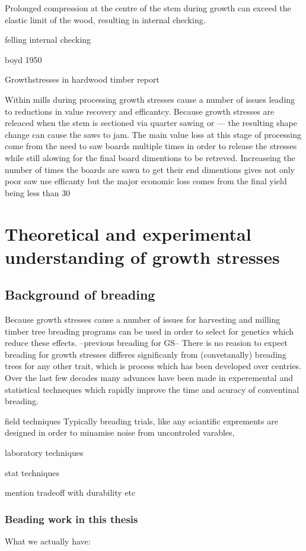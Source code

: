 \documentclass{article}
\begin{document}
Prolonged compression at the centre of the stem during growth can exceed the
elastic limit of the wood, resulting in internal checking.



felling internal checking

boyd 1950

Growthstresses in hardwood timber report

Within mills during processing growth stresses cause a number of issues leading
to reductions in value recovery and efficantcy. Because growth stresses are
releaced when the stem is sectioned via quarter sawing or --- the resulting
shape change can cause the saws to jam. The main value loss at this stage of
processing come from the need to saw boards multiple times in order to release
the stresses while still alowing for the final board dimentions to be retreved.
Increaseing the number of times the boards are sawn to get their end dimentions
gives not only poor saw use efficanty but the major economic loss comes from the
final yield being less than 30%


\section{Theoretical and experimental understanding of growth stresses}

\subsection{Background of breading}
Because growth stresses cause a number of issues for harvesting and milling
timber tree breading programs can be used in order to select for genetics which
reduce these effects. --previous breading for GS-- There is no reasion to
expect  breading for growth stresses differes significanly from (convetanally)
breading trees for any other trait, which is process which has been developed
over centries. Over the last few decades many advances have been made in
experemental and statistical techneques which rapidly improve the time and
acuracy of conventinal breading.

 field techniques
Typically breading trials, like any sciantific exprements are designed in order
to minamise noise from uncontroled varables,

laboratory techniques


stat techniques

mention tradeoff with durability etc

\subsubsection{Beading work in this thesis}
What we actually have:
\end{document}
